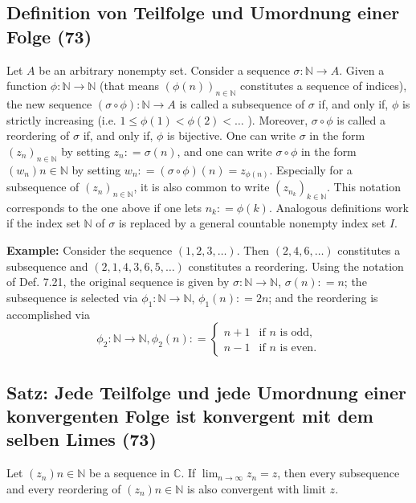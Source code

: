 \subsection{Definition von Teilfolge und Umordnung einer Folge (73)}
Let $A$ be an arbitrary nonempty set. Consider a sequence $\sigma : \mathbb { N } \rightarrow A$. Given a function $\phi : \mathbb { N } \rightarrow \mathbb { N }$ (that means $( \phi ( n ) ) _ { n \in \mathbb { N } }$ constitutes a sequence of
indices), the new sequence $( \sigma \circ \phi ) : \mathbb { N } \rightarrow A$ is called a subsequence of $\sigma$ if, and
only if, $\phi$ is strictly increasing (i.e. $1\leq \phi ( 1) < \phi ( 2) < \dots$ ). Moreover, $ \sigma \circ \phi$ is
called a reordering of $\sigma$ if, and only if, $\phi$ is bijective. One can write $\sigma$ in the form
$(z_{ n }) _ { n \in \mathbb { N } }$ by setting $z _ { n } : = \sigma ( n )$, and one can write $ \sigma \circ \phi$  in the form $\left( w _ { n } \right) n \in \mathbb { N }$ by setting
$w _ { n } : = ( \sigma \circ \phi ) ( n ) = z _ { \phi ( n ) }$. Especially for a subsequence of $(z_{ n }) _ { n \in \mathbb { N } }$, it is also common
to write $\left( z _ { n _ { k } } \right) _ { k \in \mathbb { N } }$. This notation corresponds to the one above if one lets $n _ { k } : = \phi ( k )$.
Analogous definitions work if the index set $\mathbb{N}$ of $\sigma$ is replaced by a general countable nonempty index set $I$. \newline
\begin{leftbar}
\textbf{Example:} Consider the sequence $(1, 2, 3, \dots )$. Then $(2, 4, 6, \dots )$ constitutes a subsequence and $(2, 1, 4, 3, 6, 5, \dots )$ constitutes a reordering. Using the notation of Def. 7.21, the original sequence is given by $\sigma : \mathbb { N } \rightarrow \mathbb { N }$, $\sigma ( n ) : = n$; the subsequence
is selected via $\phi _ { 1} : \mathbb { N } \rightarrow \mathbb { N }$, $\phi _ { 1} ( n ) : = 2n$; and the reordering is accomplished via
\begin{equation}
\phi _ { 2} : \mathbb { N } \rightarrow \mathbb { N } ,\phi _ { 2} ( n ) : =
\begin{cases}
n + 1 & \text{if $n$ is odd,} \\
n - 1 & \text{if $n$ is even.}
\end{cases}
\end{equation}
\end{leftbar}

\subsection{Satz: Jede Teilfolge und jede Umordnung einer konvergenten Folge ist konvergent mit dem selben Limes (73)}
Let $\left( z _ { n } \right) n \in \mathbb { N }$ be a sequence in $\mathbb{C}$. If $\lim _ { n \rightarrow \infty } z _ { n } = z$, then every
subsequence and every reordering of $\left( z _ { n } \right) n \in \mathbb { N }$ is also convergent with limit $z$.